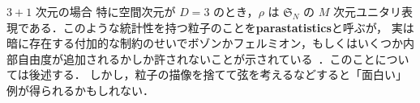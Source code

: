 \documentclass[TQFT_main]{subfiles}
\begin{document}
\begin{myexample}[label=ex:1-3nonabelian]{$3+1$ 次元の場合}
    特に空間次元が $D=3$ のとき，$\rho$ は $\mathfrak{S}_N$ の $M$ 次元ユニタリ表現である．このような統計性を持つ粒子のことを\textbf{parastatistics}と呼ぶが，
    実は暗に存在する付加的な制約のせいでボゾンかフェルミオン，もしくはいくつか内部自由度が追加されるかしか許されないことが示されている~\cite[Appendix B]{HalvorsonMuger2006}．このことについては後述する．
    しかし，粒子の描像を捨てて弦を考えるなどすると「面白い」例が得られるかもしれない．
\end{myexample}
\end{document}
